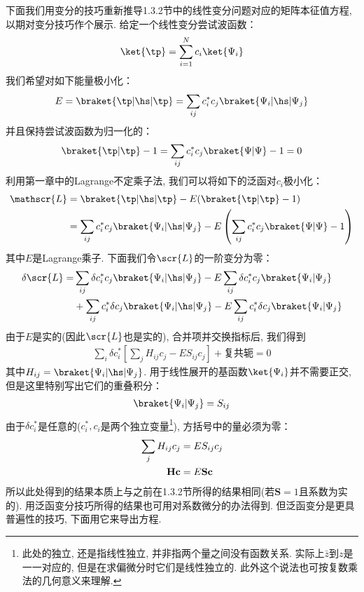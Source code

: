 下面我们用变分的技巧重新推导1.3.2节中的线性变分问题对应的矩阵本征值方程, 以期对变分技巧作个展示. 给定一个线性变分尝试波函数：
\begin{align}
\ket{\tp} = \sum_{i=1}^{N}c_i\ket{\Psi_i}
\end{align}
我们希望对如下能量极小化：
\begin{align}
E = \braket{\tp|\hs|\tp} = \sum_{ij} c_i^*c_j\braket{\Psi_i|\hs|\Psi_j}
\end{align}
并且保持尝试波函数为归一化的：
\begin{align}
\braket{\tp|\tp} - 1 = \sum_{ij}c_i^*c_j \braket{\Psi|\Psi} - 1 = 0
\end{align}
利用第一章中的Lagrange不定乘子法, 我们可以将如下的泛函对$c_i$极小化：
\begin{align}
\mathscr{L} & = \braket{\tp|\hs|\tp} - E(\braket{\tp|\tp}-1) \notag\\
            & = \sum_{ij}c_i^*c_j\braket{\Psi_i|\hs|\Psi_j} - E\left( \sum_{ij}c_i^*c_j \braket{\Psi|\Psi} - 1 \right)
\end{align}
其中$E$是Lagrange乘子. 下面我们令$\scr{L}$的一阶变分为零：
\begin{align}
\delta\scr{L} = & \sum_{ij}\delta c_i^*c_j\braket{\Psi_i|\hs|\Psi_j} - E\sum_{ij}\delta c_i^*c_j\braket{\Psi_i|\Psi_j} \notag \\
              & +  \sum_{ij}c_i^*\delta c_j\braket{\Psi_i|\hs|\Psi_j} - E\sum_{ij}c_i^*\delta c_j\braket{\Psi_i|\Psi_j}
\end{align}
由于$E$是实的(因此$\scr{L}$也是实的), 合并项并交换指标后, 我们得到
\begin{align}
\sum_i\delta c_i^*\left[ \sum_j H_{ij}c_j - ES_{ij}c_j \right] + \text{复共轭} = 0
\end{align}
其中$H_{ij} = \braket{\Psi_i|\hs|\Psi_j}$. 用于线性展开的基函数$\ket{\Psi_i}$并不需要正交, 但是这里特别写出它们的重叠积分：
\begin{align}
\braket{\Psi_i|\Psi_j} = S_{ij}
\end{align}
由于$\delta c_i^*$是任意的($c_i^*,c_i$是两个独立变量\footnote{
此处的独立, 还是指线性独立, 并非指两个量之间没有函数关系. 实际上$\bar{z}$到$z$是一一对应的, 但是在求偏微分时它们是线性独立的. 此外这个说法也可按复数乘法的几何意义来理解.
%
%
%
}), 方括号中的量必须为零：
\begin{align}
\sum_j H_{ij}c_j & = ES_{ij}c_j \notag\\
\mathbf{Hc} & = E\mathbf{Sc}
\end{align}
所以此处得到的结果本质上与之前在1.3.2节所得的结果相同(若$\mathbf{S}=1$且系数为实的). 用泛函变分技巧所得的结果也可用对系数微分的办法得到. 但泛函变分是更具普遍性的技巧, 下面用它来导出\hft 方程. 
